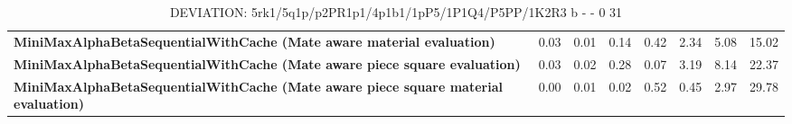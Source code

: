 \begin{table}[H]
{\begin{tabular}{|p{8cm}|*{7}{r|}}
            \rowcolor[HTML]{EFEFEF}
            \textbf{MiniMaxAlphaBetaSequentialWithCache (Mate aware material evaluation)}              & 0.03 & 0.01 & 0.14 & 0.42 & 2.34 & 5.08 & 15.02 \\
            \rowcolor[HTML]{FFFFFF}
            \textbf{MiniMaxAlphaBetaSequentialWithCache (Mate aware piece square evaluation)}               & 0.03 & 0.02 & 0.28 & 0.07 & 3.19 & 8.14 & 22.37 \\
            \rowcolor[HTML]{EFEFEF}
            \textbf{MiniMaxAlphaBetaSequentialWithCache (Mate aware piece square material evaluation)}               & 0.00 & 0.01 & 0.02 & 0.52 & 0.45 & 2.97 & 29.78 \\

            \hline
        \end{tabular}%
    }
    \caption{DEVIATION: 5rk1/5q1p/p2PR1p1/4p1b1/1pP5/1P1Q4/P5PP/1K2R3 b - - 0 31}
    \label{tab:mid-game---deflection---short-deviation}
\end{table}
